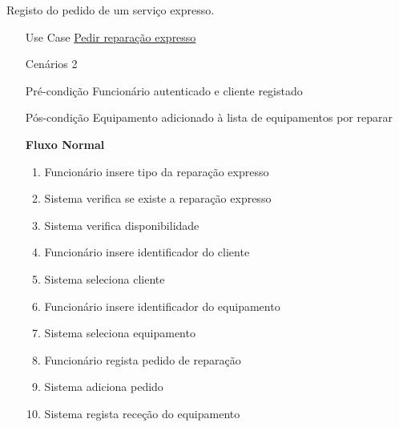 \documentclass[../relatorio.tex]{subfiles}
\begin{document}
Registo do pedido de um serviço expresso.
\begin{itemize}
    \item[Use Case] {\underline{Pedir reparação expresso}}
    \item[Cenários] {2}
    \item[Pré-condição] {Funcionário autenticado e cliente registado}
    \item[Pós-condição] {Equipamento adicionado à lista de equipamentos por reparar}
          \begin{flushleft}
              \textbf{Fluxo Normal}
          \end{flushleft}
          \begin{enumerate}
              \item Funcionário insere tipo da reparação expresso 
              \item Sistema verifica se existe a reparação expresso
              \item Sistema verifica disponibilidade
              \item Funcionário insere identificador do cliente
              \item Sistema seleciona cliente
              \item Funcionário insere identificador do equipamento
              \item Sistema seleciona equipamento
              \item Funcionário regista pedido de reparação
              \item Sistema adiciona pedido
              \item Sistema regista receção do equipamento
          \end{enumerate}


\end{itemize}
\end{document}
